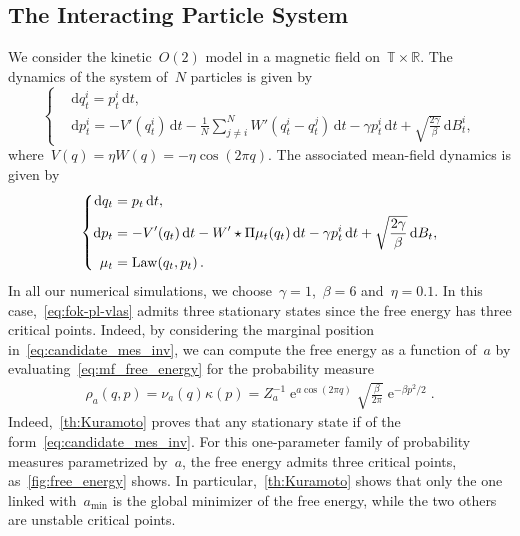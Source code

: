 \documentclass[onefignum,onetabnum]{siamart251216} %
\DeclareMathOperator{\e}{e}
\renewcommand{\d}{\mathrm{d}}
\newcommand{\torus}{\mathbb T}
\newcommand{\real}{\mathbb R}
\newcommand{\mescin}{\mu}
\newcommand{\mespos}{\nu}
\newcommand{\mesvit}{\kappa}
\newcommand{\projp}{\Pi}
\newcommand{\vqt}[1]{q_t^{#1}}
\newcommand{\vpt}[1]{p_t^{#1}}
\theoremstyle{plain}
\numberwithin{equation}{section}
\numberwithin{theorem}{section}
\begin{document}
\subsection{The Interacting Particle System}
\label{subsec:numerical_model}
We consider the kinetic~$O(2)$ model in a magnetic field on~$\torus \times \real$. The dynamics of the system of~$N$ particles is given by
\begin{equation}
    \label{eq:kinetic_kuramoto}
    \left\{\begin{aligned}
    &\d \vqt{i} =  \vpt{i}\, \d t, \\
    &\d \vpt{i} = -V'(\vqt{i})\,\d t -\frac1N \sum_{j\neq i}^{N}W'(\vqt{i} -\vqt{j}) \,\d t - \gamma \vpt{i} \,\d t + \sqrt{\frac{2 \gamma}{\beta}}\,\d B_t^i,
    \end{aligned}\right.
\end{equation}
where~$V(q) = \eta W(q) = -\eta\cos(2\pi q)$.
The associated mean-field dynamics is given by
\begin{equation}
    \label{eq:kinetic_kuramoto_mf}
    \left\{\begin{aligned}
    \d q_t &=  p_t\, \d t, \\
    \d p_t &= -V'(q_t)\,\d t -W'\star\projp\mescin_t(q_t) \,\d t - \gamma \vpt{i} \,\d t + \sqrt{\frac{2 \gamma}{\beta}}\,\d B_t, \\
    \mescin_t &= {\rm Law}(q_t, p_t) \, .
    \end{aligned}\right.
\end{equation}
In all our numerical simulations, we choose~$\gamma = 1$,~$\beta= 6$ and~$\eta = 0.1$. In this case,~\eqref{eq:fok-pl-vlas} admits three stationary states since the free energy has three critical points. Indeed,
by considering the marginal position in~\eqref{eq:candidate_mes_inv},
we can compute the free energy as a function of~$a$ by evaluating~\eqref{eq:mf_free_energy} for the probability measure
\begin{align}
    \label{eq:candidate_mes_inv}
    \rho_a(q,p) = \mespos_a(q)\mesvit(p) = Z_a^{-1} \e^{a\cos(2\pi q)} \sqrt{\frac{\beta}{2\pi}}\e^{-\beta p^2 /2}.
\end{align}
Indeed,~\cref{th:Kuramoto} proves that any stationary state if of the form~\eqref{eq:candidate_mes_inv}.
For this one-parameter family of probability measures parametrized by~$a$,
the free energy admits three critical points,
as~\cref{fig:free_energy} shows. In particular,~\cref{th:Kuramoto} shows that only the one linked with~$a_{\min}$ is the global minimizer of the free energy, while the two others are unstable critical points.
\end{document}
